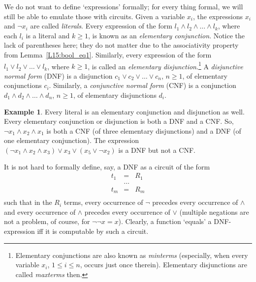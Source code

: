 \documentclass[12pt,notitlepage]{article}
\theoremstyle{plain}
\theoremstyle{definition}
\newtheorem{exm}[thm]{Example}
\theoremstyle{plain}
\newcommand{\1}{\mathbf{1}}
\newcommand{\0}{\mathbf{0}}
\begin{document}
We do not want to define `expressions' formally; for every thing formal, we will still be able to emulate those with circuits. Given a variable $x_i$, the expressions $x_i$ and $\neg x_i$ are called \emph{literals}. Every expression of the form $l_1 \wedge l_2 \wedge \ldots \wedge l_k$, where each $l_i$ is a literal and $k \ge 1$, is known as an \emph{elementary conjunction}. Notice the lack of parentheses here; they do not matter due to the associativity property from Lemma~\ref{L15:bool_eq1}. Similarly, every expression of the form $l_1 \vee l_2 \vee \ldots \vee l_k$, where $k \ge 1$, is called an \emph{elementary disjunction}.\footnote{Elementary conjunctions are also known as \emph{minterms} (especially, when every variable $x_i$, $1 \leq i \leq n$, occurs just once therein). Elementary disjunctions are called \emph{maxterms} then.} A \emph{disjunctive normal form} (DNF) is a disjunction $c_1 \vee c_2 \vee \ldots \vee c_n$, $n \geq 1$, of elementary conjunctions $c_i$. Similarly, a \emph{conjunctive normal form} (CNF) is a conjunction $d_1 \wedge d_2 \wedge \ldots \wedge d_n$, $n \geq 1$, of elementary disjunctions $d_i$.

\begin{exm}
Every literal is an elementary conjunction and disjunction as well. Every elementary conjunction or disjunction is both a DNF and a CNF. So, $\neg x_1 \wedge x_2 \wedge x_1$ is both a CNF (of three elementary disjunctions) and a DNF (of one elementary conjunction). The expression $(\neg x_1 \wedge x_2 \wedge x_3) \vee x_3 \vee (x_5 \vee \neg x_2)$ is a DNF but not a CNF.
\end{exm}

It is not hard to formally define, say, a DNF as a circuit of the form 
$$
\begin{array}{rcl}
t_1 &=& R_1\\
&\ldots&\\
t_m &=& R_m\\
\end{array}
$$
such that in the $R_i$ terms, every occurrence of $\neg$ precedes every occurrence of $\wedge$ and every occurrence of $\wedge$ precedes every occurrence of $\vee$ (multiple negations are not a problem, of course, for $\neg \neg x = x$). Clearly, a function `equals' a DNF-expression iff it is computable by such a circuit. 
\end{document}

